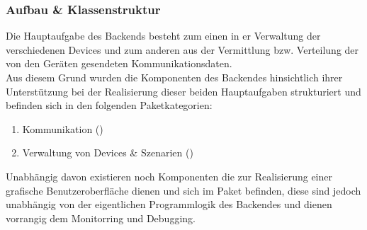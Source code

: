 \subsubsection{Aufbau \& Klassenstruktur}
Die Hauptaufgabe des Backends besteht zum einen in er Verwaltung der verschiedenen Devices und zum anderen aus der Vermittlung
bzw. Verteilung der von den Geräten gesendeten Kommunikationsdaten.
\\
Aus diesem Grund wurden die Komponenten des Backendes hinsichtlich ihrer Unterstützung bei der Realisierung dieser beiden Hauptaufgaben
strukturiert und befinden sich in den folgenden Paketkategorien:
\begin{enumerate}
	\item{Kommunikation ()}
	\item{Verwaltung von Devices \& Szenarien ()}
\end{enumerate}
Unabhängig davon existieren noch Komponenten die zur Realisierung einer grafische Benutzeroberfläche dienen und sich im Paket 
 befinden, diese sind jedoch 
unabhängig von der eigentlichen Programmlogik des Backendes und dienen vorrangig dem Monitorring und Debugging.
